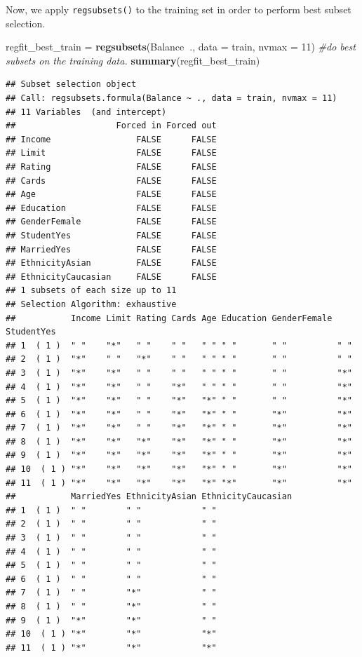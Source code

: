 \documentclass[
]{article}
\newenvironment{Shaded}{\begin{snugshade}}{\end{snugshade}}
\newcommand{\CommentTok}[1]{\textcolor[rgb]{0.56,0.35,0.01}{\textit{#1}}}
\newcommand{\DataTypeTok}[1]{\textcolor[rgb]{0.13,0.29,0.53}{#1}}
\newcommand{\DecValTok}[1]{\textcolor[rgb]{0.00,0.00,0.81}{#1}}
\newcommand{\KeywordTok}[1]{\textcolor[rgb]{0.13,0.29,0.53}{\textbf{#1}}}
\newcommand{\NormalTok}[1]{#1}
\newcommand{\OperatorTok}[1]{\textcolor[rgb]{0.81,0.36,0.00}{\textbf{#1}}}
\newcommand{\StringTok}[1]{\textcolor[rgb]{0.31,0.60,0.02}{#1}}
\begin{document}
Now, we apply \texttt{regsubsets()} to the training set in order to
perform best subset selection.

\begin{Shaded}
\begin{Highlighting}[]
\NormalTok{regfit_best_train =}\StringTok{ }\KeywordTok{regsubsets}\NormalTok{(Balance}\OperatorTok{~}\NormalTok{., }\DataTypeTok{data =}\NormalTok{ train, }\DataTypeTok{nvmax =} \DecValTok{11}\NormalTok{)  }\CommentTok{#do best subsets on the training data.}
\KeywordTok{summary}\NormalTok{(regfit_best_train)}
\end{Highlighting}
\end{Shaded}

\begin{verbatim}
## Subset selection object
## Call: regsubsets.formula(Balance ~ ., data = train, nvmax = 11)
## 11 Variables  (and intercept)
##                    Forced in Forced out
## Income                 FALSE      FALSE
## Limit                  FALSE      FALSE
## Rating                 FALSE      FALSE
## Cards                  FALSE      FALSE
## Age                    FALSE      FALSE
## Education              FALSE      FALSE
## GenderFemale           FALSE      FALSE
## StudentYes             FALSE      FALSE
## MarriedYes             FALSE      FALSE
## EthnicityAsian         FALSE      FALSE
## EthnicityCaucasian     FALSE      FALSE
## 1 subsets of each size up to 11
## Selection Algorithm: exhaustive
##           Income Limit Rating Cards Age Education GenderFemale StudentYes
## 1  ( 1 )  " "    "*"   " "    " "   " " " "       " "          " "       
## 2  ( 1 )  "*"    " "   "*"    " "   " " " "       " "          " "       
## 3  ( 1 )  "*"    "*"   " "    " "   " " " "       " "          "*"       
## 4  ( 1 )  "*"    "*"   " "    "*"   " " " "       " "          "*"       
## 5  ( 1 )  "*"    "*"   " "    "*"   "*" " "       " "          "*"       
## 6  ( 1 )  "*"    "*"   " "    "*"   "*" " "       "*"          "*"       
## 7  ( 1 )  "*"    "*"   " "    "*"   "*" " "       "*"          "*"       
## 8  ( 1 )  "*"    "*"   "*"    "*"   "*" " "       "*"          "*"       
## 9  ( 1 )  "*"    "*"   "*"    "*"   "*" " "       "*"          "*"       
## 10  ( 1 ) "*"    "*"   "*"    "*"   "*" " "       "*"          "*"       
## 11  ( 1 ) "*"    "*"   "*"    "*"   "*" "*"       "*"          "*"       
##           MarriedYes EthnicityAsian EthnicityCaucasian
## 1  ( 1 )  " "        " "            " "               
## 2  ( 1 )  " "        " "            " "               
## 3  ( 1 )  " "        " "            " "               
## 4  ( 1 )  " "        " "            " "               
## 5  ( 1 )  " "        " "            " "               
## 6  ( 1 )  " "        " "            " "               
## 7  ( 1 )  " "        "*"            " "               
## 8  ( 1 )  " "        "*"            " "               
## 9  ( 1 )  "*"        "*"            " "               
## 10  ( 1 ) "*"        "*"            "*"               
## 11  ( 1 ) "*"        "*"            "*"
\end{verbatim}
\end{document}
